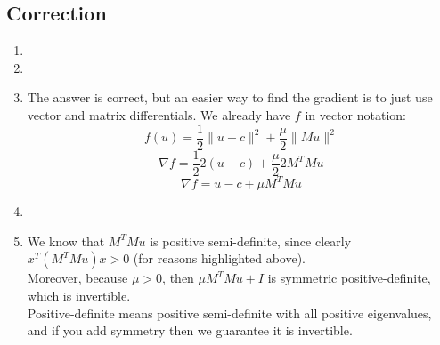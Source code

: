 \documentclass[12pt]{article}
\begin{document}
    \begingroup
    \color{red}
    \subsection*{Correction}
    \begin{enumerate}[label=\alph*)]
        \item
        
        \item 

        \item
        The answer is correct,
        but an easier way to find the gradient
        is to just use vector and matrix differentials.
        We already have $f$ in vector notation:
        \[ f(u) = \dfrac{1}{2}\| u - c \|^2
        + \dfrac{\mu}{2}\| Mu \|^2  \]
        \[ \nabla f = \dfrac{1}{2}2(u-c)
        + \dfrac{\mu}{2}2M^TMu  \]
        \[ \nabla f = u-c + \mu M^TMu  \]
        \item 

        \item
        We know that $M^TMu$
        is positive semi-definite,
        since clearly $x^T(M^TMu)x > 0$
        (for reasons highlighted above). \\
        Moreover, because $\mu > 0$,
        then $\mu M^TMu + I$
        is symmetric positive-definite,
        which is invertible. \\
        Positive-definite means
        positive semi-definite with all
        positive eigenvalues,
        and if you add symmetry then we
        guarantee it is invertible. \\
    \end{enumerate}
    \endgroup
\end{document}
